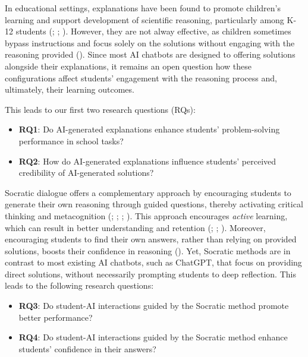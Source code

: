 \documentclass[
  11pt,
]{article}
\begin{document}
In educational settings, explanations have been found to promote children's learning and support development of scientific reasoning, particularly among K-12 students (; ; ). However, they are not alway effective, as children sometimes bypass instructions and focus solely on the solutions without engaging with the reasoning provided (). Since most AI chatbots are designed to offering solutions alongside their explanations, it remains an open question how these configurations affect students' engagement with the reasoning process and, ultimately, their learning outcomes.

This leads to our first two research questions (RQs):

\begin{itemize}
\item
  \textbf{RQ1}: Do AI-generated explanations enhance students' problem-solving performance in school tasks?
\item
  \textbf{RQ2}: How do AI-generated explanations influence students' perceived credibility of AI-generated solutions?
\end{itemize}

Socratic dialogue offers a complementary approach by encouraging students to generate their own reasoning through guided questions, thereby activating critical thinking and metacognition (; ; ; ). This approach encourages \emph{active} learning, which can result in better understanding and retention (; ; ). Moreover, encouraging students to find their own answers, rather than relying on provided solutions, boosts their confidence in reasoning (). Yet, Socratic methods are in contrast to most existing AI chatbots, such as ChatGPT, that focus on providing direct solutions, without necessarily prompting students to deep reflection. This leads to the following research questions:

\begin{itemize}
\item
  \textbf{RQ3}: Do student-AI interactions guided by the Socratic method promote better performance?
\item
  \textbf{RQ4}: Do student-AI interactions guided by the Socratic method enhance students' confidence in their answers?
\end{itemize}
\end{document}
